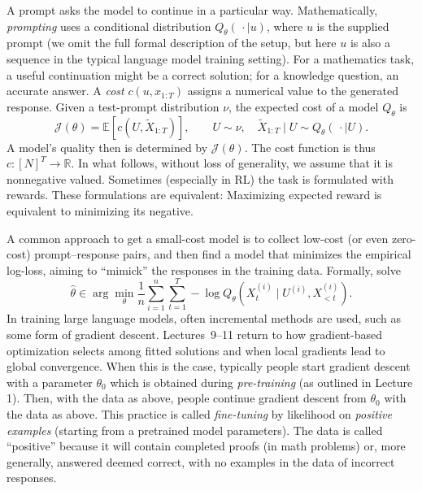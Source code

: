 \documentclass[11pt,twoside]{article}
\newcommand{\R}{\mathbb R}
\newcommand{\E}{\mathbb E}
\theoremstyle{definition}
\theoremstyle{remark}
\begin{document}
A prompt asks the model to continue in a particular way. Mathematically,
\emph{prompting} uses a conditional distribution
\(Q_\theta(\,\cdot\mid u)\), where \(u\) is the supplied prompt
(we omit the full formal description of the setup, but here $u$
is also a sequence in the typical language model training setting).
For a mathematics task, a useful continuation might be a correct solution;
for a knowledge question, an accurate answer. A \emph{cost}
\(c(u,x_{1:T})\) assigns a numerical value to the generated response.
Given a test-prompt distribution \(\nu\),
the expected cost of a model $Q_\theta$ is
\begin{equation}
  \mathcal J(\theta)=
  \E[c(U,\widetilde X_{1:T})],
  \qquad U\sim\nu,\quad
  \widetilde X_{1:T}\mid U\sim Q_\theta(\,\cdot\mid U).
  \label{eq:prompt-cost}
\end{equation}
A model's quality then is determined by $\mathcal J(\theta)$.
The cost function is thus $c: [N]^T \to \R$.
In what follows, without loss of generality,
we assume that
it is nonnegative valued.
Sometimes (especially in RL) the task is formulated with rewards.
These formulations are equivalent:
Maximizing expected reward is equivalent to minimizing its negative.

A common approach to get a small-cost model
is to collect low-cost (or even zero-cost) prompt--response pairs,
and then find a model that minimizes the empirical log-loss, aiming to
``mimick'' the responses in the training data.
Formally, solve
\begin{equation}
  \widehat\theta\in\arg\min_\theta
  \frac1n\sum_{i=1}^n\sum_{t=1}^T
  -\log Q_\theta(X^{(i)}_t\mid U^{(i)},X^{(i)}_{<t}).
  \label{eq:finetuning}
\end{equation}
In training large language models, often incremental methods are used, such
as some form of gradient descent.
Lectures~9--11 return to how gradient-based optimization selects among fitted
solutions and when local gradients lead to global convergence.
When this is the case, typically people start gradient descent with
a parameter $\theta_0$ which is obtained during \emph{pre-training} (as outlined in Lecture 1).
Then, with the data as above, people continue gradient descent
from $\theta_0$ with the data as above.
This practice is called  \emph{fine-tuning} by likelihood on \emph{positive examples}
(starting from a pretrained model parameters).
The data is called ``positive'' because it will contain completed proofs (in math problems)
or, more generally, answered deemed correct,
with no examples in the data of incorrect responses.
\end{document}
